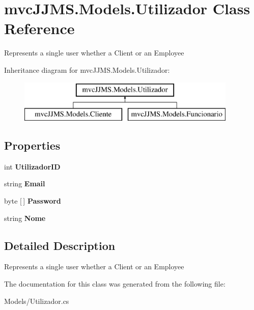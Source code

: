 \hypertarget{classmvc_j_j_m_s_1_1_models_1_1_utilizador}{}\section{mvc\+J\+J\+M\+S.\+Models.\+Utilizador Class Reference}
\label{classmvc_j_j_m_s_1_1_models_1_1_utilizador}


Represents a single user whether a Client or an Employee  


Inheritance diagram for mvc\+J\+J\+M\+S.\+Models.\+Utilizador\+:\begin{figure}[H]
\begin{center}
\leavevmode
\includegraphics[height=2.000000cm]{classmvc_j_j_m_s_1_1_models_1_1_utilizador}
\end{center}
\end{figure}
\subsection*{Properties}
\begin{DoxyCompactItemize}
\item 
\mbox{\label{classmvc_j_j_m_s_1_1_models_1_1_utilizador_a35562436f48a986eaa6e3ce1dc350718}} 
int {\bfseries Utilizador\+ID}
\item 
\mbox{\label{classmvc_j_j_m_s_1_1_models_1_1_utilizador_a84b2d5179fb51a1722818126cd1902c4}} 
string {\bfseries Email}
\item 
\mbox{\label{classmvc_j_j_m_s_1_1_models_1_1_utilizador_a4cb4c440341216f629aef41e3f078560}} 
byte \mbox{[}$\,$\mbox{]} {\bfseries Password}
\item 
\mbox{\label{classmvc_j_j_m_s_1_1_models_1_1_utilizador_a6f09601a2135efaf2d5ae2a3761791cb}} 
string {\bfseries Nome}
\end{DoxyCompactItemize}


\subsection{Detailed Description}
Represents a single user whether a Client or an Employee 



The documentation for this class was generated from the following file\+:\begin{DoxyCompactItemize}
\item 
Models/Utilizador.\+cs\end{DoxyCompactItemize}

